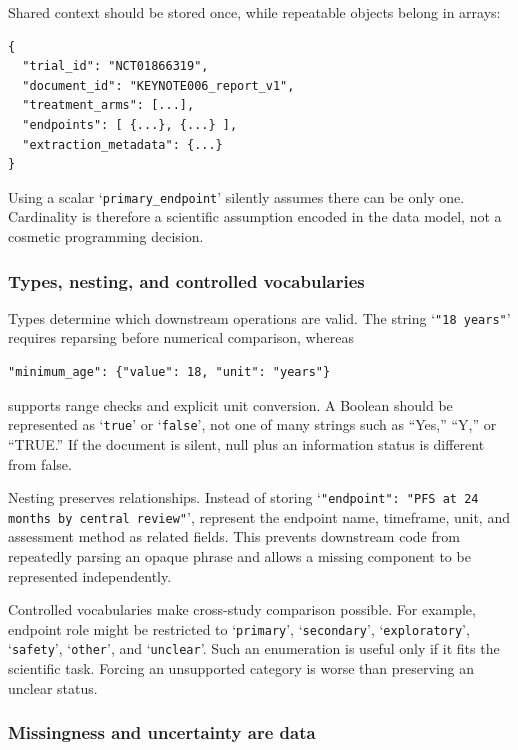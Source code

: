 \documentclass[12pt,oneside]{book}
\numberwithin{equation}{section}
\theoremstyle{definition}
\theoremstyle{plain}
\theoremstyle{remark}
\begin{document}
Shared context should be stored once, while repeatable objects belong in arrays:
\begin{lstlisting}[language={},numbers=none]
{
  "trial_id": "NCT01866319",
  "document_id": "KEYNOTE006_report_v1",
  "treatment_arms": [...],
  "endpoints": [ {...}, {...} ],
  "extraction_metadata": {...}
}
\end{lstlisting}
Using a scalar `\texttt{primary\_endpoint}' silently assumes there can be only
one.  Cardinality is therefore a scientific assumption encoded in the data
model, not a cosmetic programming decision.

\subsubsection{Types, nesting, and controlled vocabularies}

Types determine which downstream operations are valid.  The string
`\texttt{"18 years"}' requires reparsing before numerical comparison, whereas
\begin{lstlisting}[language={},numbers=none]
"minimum_age": {"value": 18, "unit": "years"}
\end{lstlisting}
supports range checks and explicit unit conversion.  A Boolean should be
represented as `\texttt{true}' or `\texttt{false}', not one of many strings such
as ``Yes,'' ``Y,'' or ``TRUE.''  If the document is silent, null plus an
information status is different from false.

Nesting preserves relationships.  Instead of storing
`\texttt{"endpoint": "PFS at 24 months by central review"}', represent the
endpoint name, timeframe, unit, and assessment method as related fields.  This
prevents downstream code from repeatedly parsing an opaque phrase and allows a
missing component to be represented independently.

Controlled vocabularies make cross-study comparison possible.  For example,
endpoint role might be restricted to `\texttt{primary}', `\texttt{secondary}',
`\texttt{exploratory}', `\texttt{safety}', `\texttt{other}', and
`\texttt{unclear}'.  Such an enumeration is useful only if it fits the
scientific task.  Forcing an unsupported category is worse than preserving an
unclear status.

\subsubsection{Missingness and uncertainty are data}
\end{document}
